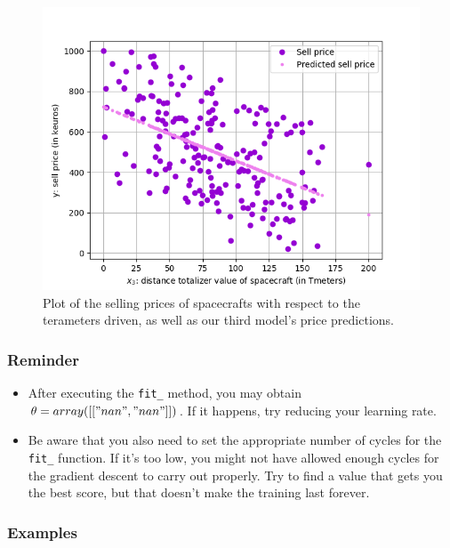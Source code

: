 \documentclass{42-en}
\begin{document}
\begin{figure}[!h]
  \centering
  \includegraphics[scale=0.6]{assets/ex07_price_vs_Tmeters_part1.png}
  \caption{Plot of the selling prices of spacecrafts with respect to the terameters driven, as well as our third model's price predictions.}
\end{figure}

\subsubsection*{Reminder}
\begin{itemize}
  \item After executing the \texttt{fit\_} method, you may obtain  $\theta = array([["nan", "nan"]])$.
    If it happens, try reducing your learning rate.
  \item Be aware that you also need to set the appropriate number of cycles for the \texttt{fit\_} function.
        If it's too low, you might not have allowed enough cycles for the gradient descent to carry out properly.
        Try to find a value that gets you the best score, but that doesn't make the training last forever.
\end{itemize}


\subsubsection*{Examples}
\end{document}
